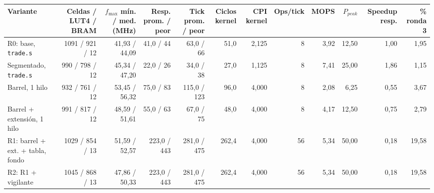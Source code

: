 \begin{tabular}{lrrrrrrrrrrr}
\toprule
Variante & Celdas / LUT4 / BRAM & $f_{\max}$ mín. / med. (MHz) & Resp. prom. / peor & Tick prom. / peor & Ciclos kernel & CPI kernel & Ops/tick & MOPS & $P_{peak}$ & Speedup resp. & \% ronda 3 \\
\midrule
R0: base, \texttt{trade.s} & 1091 / 921 / 12 & 41{,}93 / 44{,}09 & 41{,}0 / 44 & 63{,}0 / 66 & 51{,}0 & 2{,}125 & 8 & 3{,}92 & 12{,}50 & 1{,}00 & 1{,}95 \\
Segmentado, \texttt{trade.s} & 990 / 798 / 12 & 45{,}34 / 47{,}20 & 22{,}0 / 26 & 34{,}0 / 38 & 27{,}0 & 1{,}125 & 8 & 7{,}41 & 25{,}00 & 1{,}86 & 1{,}15 \\
Barrel, 1 hilo & 932 / 761 / 12 & 53{,}45 / 56{,}32 & 75{,}0 / 83 & 115{,}0 / 123 & 96{,}0 & 4{,}000 & 8 & 2{,}08 & 6{,}25 & 0{,}55 & 3{,}67 \\
Barrel + extensión, 1 hilo & 991 / 817 / 12 & 48{,}59 / 51{,}61 & 55{,}0 / 63 & 67{,}0 / 75 & 48{,}0 & 4{,}000 & 8 & 4{,}17 & 12{,}50 & 0{,}75 & 2{,}79 \\
R1: barrel + ext. + tabla, fondo & 1029 / 854 / 13 & 51{,}59 / 52{,}57 & 223{,}0 / 443 & 281{,}0 / 475 & 262{,}4 & 4{,}000 & 56 & 5{,}34 & 50{,}00 & 0{,}18 & 19{,}58 \\
R2: R1 + vigilante & 1045 / 868 / 13 & 47{,}86 / 50{,}33 & 223{,}0 / 443 & 281{,}0 / 475 & 262{,}4 & 4{,}000 & 56 & 5{,}34 & 50{,}00 & 0{,}18 & 19{,}58 \\
\bottomrule
\end{tabular}
\par{}
